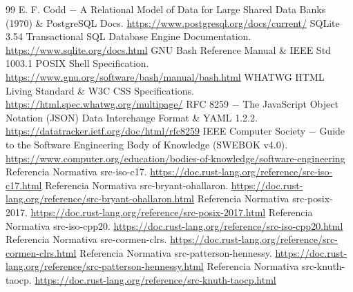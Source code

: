 \documentclass{book}
\begin{document}
\begin{thebibliography}{99}
 E. F. Codd \(-\) A Relational Model of Data for Large Shared Data Banks (1970) \& PostgreSQL Docs. \url{https://www.postgresql.org/docs/current/}
 SQLite 3.54 Transactional SQL Database Engine Documentation. \url{https://www.sqlite.org/docs.html}
 GNU Bash Reference Manual \& IEEE Std 1003.1 POSIX Shell Specification. \url{https://www.gnu.org/software/bash/manual/bash.html}
 WHATWG HTML Living Standard \& W3C CSS Specifications. \url{https://html.spec.whatwg.org/multipage/}
 RFC 8259 \(-\) The JavaScript Object Notation (JSON) Data Interchange Format \& YAML 1.2.2. \url{https://datatracker.ietf.org/doc/html/rfc8259}
 IEEE Computer Society \(-\) Guide to the Software Engineering Body of Knowledge (SWEBOK v4.0). \url{https://www.computer.org/education/bodies-of-knowledge/software-engineering}
 Referencia Normativa src-iso-c17. \url{https://doc.rust-lang.org/reference/src-iso-c17.html}
 Referencia Normativa src-bryant-ohallaron. \url{https://doc.rust-lang.org/reference/src-bryant-ohallaron.html}
 Referencia Normativa src-posix-2017. \url{https://doc.rust-lang.org/reference/src-posix-2017.html}
 Referencia Normativa src-iso-cpp20. \url{https://doc.rust-lang.org/reference/src-iso-cpp20.html}
 Referencia Normativa src-cormen-clrs. \url{https://doc.rust-lang.org/reference/src-cormen-clrs.html}
 Referencia Normativa src-patterson-hennessy. \url{https://doc.rust-lang.org/reference/src-patterson-hennessy.html}
 Referencia Normativa src-knuth-taocp. \url{https://doc.rust-lang.org/reference/src-knuth-taocp.html}
\end{thebibliography}
\end{document}
